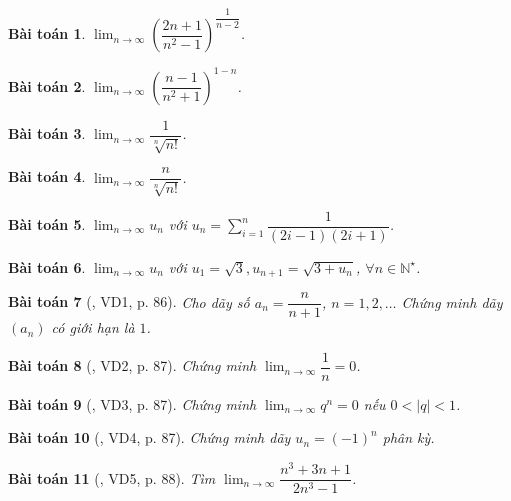 \documentclass{article}
\newtheorem{baitoan}{Bài toán}
\begin{document}
\begin{baitoan}
	$\lim_{n\to\infty} \left(\dfrac{2n + 1}{n^2 - 1}\right)^{\dfrac{1}{n - 2}}$.
\end{baitoan}

\begin{baitoan}
	$\lim_{n\to\infty} \left(\dfrac{n - 1}{n^2 + 1}\right)^{1 - n}$.
\end{baitoan}

\begin{baitoan}
	$\lim_{n\to\infty} \dfrac{1}{\sqrt[n]{n!}}$.
\end{baitoan}

\begin{baitoan}
	$\lim_{n\to\infty} \dfrac{n}{\sqrt[n]{n!}}$.
\end{baitoan}

\begin{baitoan}
	$\lim_{n\to\infty} u_n$ với $u_n = \sum_{i=1}^n \dfrac{1}{(2i - 1)(2i + 1)}$.
\end{baitoan}

\begin{baitoan}
	$\lim_{n\to\infty} u_n$ với $u_1 = \sqrt{3},u_{n+1} = \sqrt{3 + u_n}$, $\forall n\in\mathbb{N}^\star$.
\end{baitoan}


\begin{baitoan}[\cite{Hung_nang_cao_phat_trien_Toan_11_tap_1}, VD1, p. 86]
	Cho dãy số $a_n = \dfrac{n}{n + 1}$, $n = 1,2,\ldots$ Chứng minh dãy $(a_n)$ có giới hạn là $1$.
\end{baitoan}

\begin{baitoan}[\cite{Hung_nang_cao_phat_trien_Toan_11_tap_1}, VD2, p. 87]
	Chứng minh $\lim_{n\to\infty} \dfrac{1}{n} = 0$.
\end{baitoan}

\begin{baitoan}[\cite{Hung_nang_cao_phat_trien_Toan_11_tap_1}, VD3, p. 87]
	Chứng minh $\lim_{n\to\infty} q^n = 0$ nếu $0 < |q| < 1$.
\end{baitoan}

\begin{baitoan}[\cite{Hung_nang_cao_phat_trien_Toan_11_tap_1}, VD4, p. 87]
	Chứng minh dãy $u_n = (-1)^n$ phân kỳ.
\end{baitoan}

\begin{baitoan}[\cite{Hung_nang_cao_phat_trien_Toan_11_tap_1}, VD5, p. 88]
	Tìm $\lim_{n\to\infty} \dfrac{n^3 + 3n + 1}{2n^3 - 1}$.
\end{baitoan}
\end{document}
